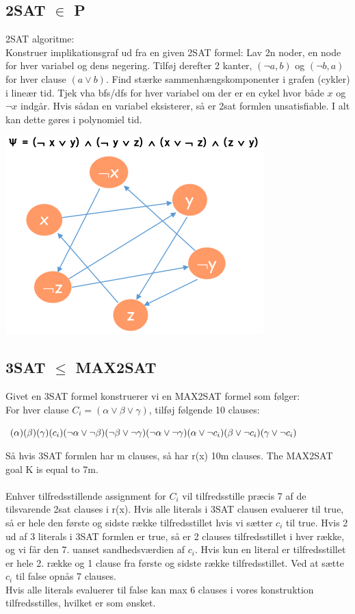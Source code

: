 \documentclass{article}
\begin{document}
\subsection{2SAT $\in$ P}
2SAT algoritme:\\
Konstruer implikationsgraf ud fra en given 2SAT formel: Lav 2n noder, en node for hver variabel og dens negering. Tilføj derefter 2 kanter, $(\lnot a, b)$ og $(\lnot b,a)$ for hver clause $(a \lor b)$. Find stærke sammenhængskomponenter i grafen (cykler) i lineær tid. Tjek vha bfs/dfs for hver variabel om der er en cykel hvor både $x$ og $\lnot x$ indgår. Hvis sådan en variabel eksisterer, så er 2sat formlen unsatisfiable. I alt kan dette gøres i polynomiel tid.
\begin{center}
    \includegraphics[scale=0.7]{2sat2}
\end{center}
\subsection{3SAT $\le$ MAX2SAT}
Givet en 3SAT formel konstruerer vi en MAX2SAT formel som følger: 
\\
For hver clause $C_i = (\alpha \lor \beta \lor \gamma)$, tilføj følgende 10 clauses:
\begin{center}
    $(\alpha)(\beta)(\gamma)(c_i)\\
    (\lnot \alpha \lor \lnot \beta)(\lnot \beta \lor \lnot \gamma)(\lnot \alpha \lor \lnot \gamma)\\
    (\alpha \lor \lnot c_i)(\beta \lor \lnot c_i)(\gamma \lor \lnot c_i)$
\end{center}
Så hvis 3SAT formlen har m clauses, så har r(x) 10m clauses. The MAX2SAT goal K is equal to 7m.\\\\
Enhver tilfredsstillende assignment for $C_i$ vil tilfredsstille præcis 7 af de tilsvarende 2sat clauses i r(x). Hvis alle literals i 3SAT clausen evaluerer til true, så er hele den første og sidste række tilfredsstillet hvis vi sætter $c_i$ til true. Hvis 2 ud af 3 literals i 3SAT formlen er true, så er 2 clauses tilfredsstillet i hver række, og vi får den 7. uanset sandhedsværdien af $c_i$. Hvis kun en literal er tilfredsstillet er hele 2. række og 1 clause fra første og sidste række tilfredsstillet. Ved at sætte $c_i$ til false opnås 7 clauses.\\
Hvis alle literals evaluerer til false kan max 6 clauses i vores konstruktion tilfredsstilles, hvilket er som ønsket. 
\end{document}
